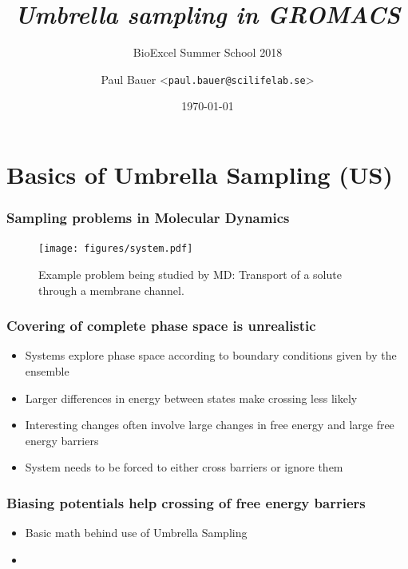 \documentclass{beamer}
\title{\emph{Umbrella sampling in GROMACS}}
\subtitle{BioExcel Summer School 2018}
\author[Paul Bauer]%
{Paul Bauer <\texttt{paul.bauer@scilifelab.se}>}
\institute[SciLifeLab, KTH] %
{
  SciLifeLab\\
  KTH
}
\date[\footnotesize{\today}] %
{\today}
\numberwithin{table}{section}
\numberwithin{figure}{section}
\numberwithin{equation}{section}
\begin{document}
\begin{frame}[plain] %
  \titlepage
\end{frame}



\section{Basics of Umbrella Sampling (US)}

\begin{frame}
\frametitle{Sampling problems in Molecular Dynamics}
    \begin{figure}[htb]
        \centering
        \texttt{[image: figures/system.pdf]}
        \caption{Example problem being studied by MD: Transport of a solute through a membrane channel.}
    \end{figure}
\end{frame}

\begin{frame}
\frametitle{Covering of complete phase space is unrealistic}
    \begin{itemize}
        \item{Systems explore phase space according to boundary conditions given by the ensemble}
        \item{Larger differences in energy between states make crossing less likely}
        \item{Interesting changes often involve large changes in free energy and large free energy barriers}
        \item{System needs to be forced to either cross barriers or ignore them}
    \end{itemize}
\end{frame}

\begin{frame}
\frametitle{Biasing potentials help crossing of free energy barriers}
    \begin{itemize}
        \item{Basic math behind use of Umbrella Sampling}
        \item{
                \begin{equation}
                \end{equation}
            }
    \end{itemize}
\end{frame}
\end{document}
